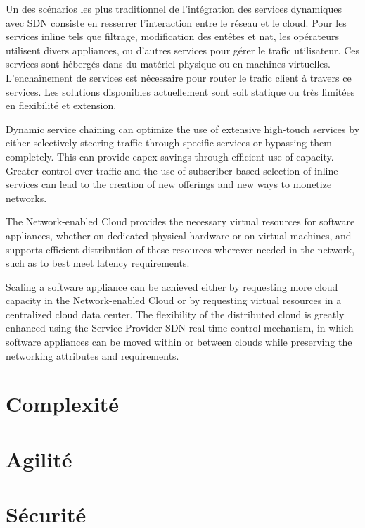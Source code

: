 Un des scénarios les plus traditionnel de l'intégration des services dynamiques avec SDN consiste en resserrer l'interaction entre le réseau et le cloud. Pour les services inline tels que filtrage, modification des entêtes et \gls{nat}, les opérateurs utilisent divers appliances, ou d'autres services pour gérer le trafic utilisateur. Ces services sont hébergés dans du matériel physique ou en machines virtuelles. L’enchaînement de services est nécessaire pour router le trafic client à travers ce services. Les solutions disponibles actuellement sont soit statique ou très limitées en flexibilité et extension.

Dynamic service chaining can optimize the use of extensive high-touch services by either selectively steering traffic through specific services or bypassing them completely. This can provide capex savings through efficient use of capacity. Greater control over traffic and the use of subscriber-based selection of inline services can lead to the creation of new offerings and new ways to monetize networks.

The Network-enabled Cloud provides the necessary virtual resources for software appliances, whether on dedicated physical hardware or on virtual machines, and supports efficient distribution of these resources wherever needed in the network, such as to best meet latency requirements. 

Scaling a software appliance can be achieved either by requesting more cloud capacity in the Network-enabled Cloud or by requesting virtual resources in a centralized cloud data center. The flexibility of the distributed cloud is greatly enhanced using the Service Provider SDN real-time control mechanism, in which software appliances can be moved within or between clouds while preserving the networking attributes and requirements.



\section{Complexité}

\section{Agilité}

\section{Sécurité}
